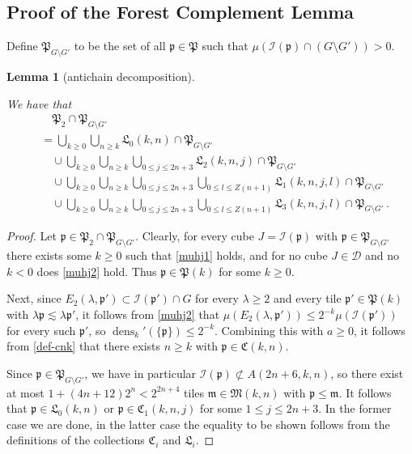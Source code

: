 \documentclass[10pt,a4paper]{article}
\theoremstyle{plain}
\newtheorem{lemma}[theorem]{Lemma}
\theoremstyle{definition}
\numberwithin{equation}{subsection}
\DeclareMathOperator{\dens}{\operatorname{dens}}
\newcommand{\fp}{{\mathfrak p}}
\newcommand{\fP}{{\mathfrak P}}
\newcommand{\fL}{{\mathfrak L}}
\newcommand{\fC}{{\mathfrak C}}
\newcommand{\scI}{{\mathcal{I}}} %
\newcommand{\lean}[1]{}
\newcommand{\leanok}{}
\begin{document}
\subsection{Proof of the Forest Complement Lemma}
\label{subsecantichain}

Define $\fP_{G \setminus G'}$ to be the set of all $\fp \in \fP$ such that $\mu(\scI(\fp) \cap (G \setminus  G')) > 0$.
\begin{lemma}[antichain decomposition]
    \label{antichain-decomposition}
    \leanok
    \lean{antichain_decomposition}
    We have that
    \begin{align}
        \label{eq-fp'-decomposition}
        &\quad \fP_2 \cap \fP_{G \setminus G'}\\
        &= \bigcup_{k \ge 0} \bigcup_{n \ge k} \fL_0(k,n) \cap \fP_{G \setminus G'} \\
        &\quad\cup \bigcup_{k \ge 0} \bigcup_{n \ge k}\bigcup_{0 \le j \le 2n+3} \fL_2(k,n,j) \cap \fP_{G \setminus G'}\\
        &\quad\cup \bigcup_{k \ge 0} \bigcup_{n \ge k}\bigcup_{0 \le j \le 2n+3} \bigcup_{0 \le l \le Z(n+1)} \fL_1(k,n,j,l) \cap \fP_{G \setminus G'}\\
        &\quad\cup \bigcup_{k \ge 0} \bigcup_{n \ge k}\bigcup_{0 \le j \le 2n+3} \bigcup_{0 \le l \le Z(n+1)} \fL_3(k,n,j,l)\cap \fP_{G \setminus G'}\,.
    \end{align}
\end{lemma}

\begin{proof}
    \leanok
    Let $\fp \in \fP_2 \cap \fP_{G \setminus G'}$. Clearly, for every cube $J = \scI(\fp)$ with $\fp \in \fP_{G \setminus G'}$ there exists some $k \ge 0$ such that \eqref{muhj1} holds, and for no cube $J \in \mathcal{D}$ and no $k < 0$ does \eqref{muhj2} hold. Thus $\fp \in \fP(k)$ for some $k \ge 0$.

    Next, since $E_2(\lambda, \fp') \subset \scI(\fp')\cap G$ for every $\lambda \ge 2$ and every tile $\fp' \in \fP(k)$ with $\lambda\fp \lesssim \lambda \fp'$, it follows from \eqref{muhj2} that $\mu(E_2(\lambda, \fp')) \le 2^{-k} \mu(\scI(\fp'))$ for every such $\fp'$, so $\dens_k'(\{\fp\}) \le 2^{-k}$. Combining this with $a \ge 0$, it follows from \eqref{def-cnk} that there exists $n\ge k$ with $\fp \in \fC(k,n)$.

    Since $\fp \in \fP_{G \setminus G'}$, we have in particular $\scI(\fp) \not \subset A(2n + 6, k, n)$, so there exist at most $1 + (4n + 12)2^n < 2^{2n+4}$ tiles $\mathfrak{m} \in \mathfrak{M}(k,n)$ with $\fp \le \mathfrak{m}$. It follows that $\fp \in \fL_0(k,n)$ or $\fp \in \fC_1(k,n,j)$ for some $1 \le j \le 2n + 3$. In the former case we are done, in the latter case the equality to be shown follows from the definitions of the collections $\fC_i$ and $\fL_i$.
\end{proof}
\end{document}

